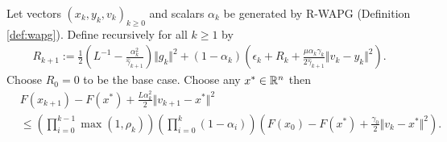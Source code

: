 \documentclass[12pt]{article}
\begin{document}
    \begin{proposition}\label{prop:wagp-convergence}
        Let vectors $(x_k, y_k, v_k)_{k \ge0}$ and scalars $\alpha_k$ be generated by R-WAPG (Definition \ref{def:wapg}). 
        Define recursively for all $k\ge1$ by 
        \begin{align*}
        R_{k + 1}
        := 
        \frac{1}{2}\left(
            L^{-1} - \frac{\alpha_k^2}{\hat \gamma_{k + 1}}
        \right)\Vert g_k\Vert^2
        + 
        (1 - \alpha_k)
        \left(
            \epsilon_k + R_k + 
            \frac{\mu\alpha_k\gamma_k}{2\hat \gamma_{k + 1}}
            \Vert v_k - y_k\Vert^2
        \right). 
        \end{align*}
        Choose $R_0= 0$ to be the base case. 
        Choose any $x^* \in \mathbb R^n$ then
        \begin{align*}
            & F(x_{k + 1}) - F(x^*) + \frac{L \alpha_k^2}{2}\Vert v_{k + 1} - x^*\Vert^2
            \\
            &\le 
            \left(
                \prod_{i = 0}^{k - 1} \max(1, \rho_{k})
            \right)
            \left(
                \prod_{i = 0}^{k} \left(1  - \alpha_i\right)
            \right)
            \left(
                F(x_0) - F(x^*) + \frac{\gamma_0}{2}\Vert v_k - x^*\Vert^2
            \right). 
        \end{align*}
    \end{proposition}
\end{document}
